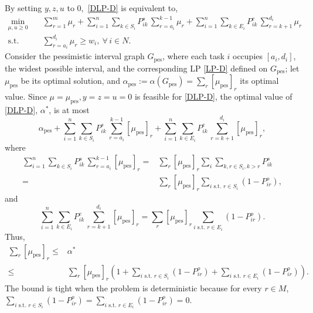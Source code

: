 \documentclass[final,5p,times,twocolumn]{elsarticle}
\DeclareMathOperator{\pes}{pes}
\begin{document}
\noindent
By setting $y,z, u$ to $0$,~\eqref{DLP-D} is equivalent to,
\begin{align*}
\tag{LP-Dpes}
\label{LP-Dpes}
\min_{\mu,u\geq 0}\quad 
& \sum_{r=1}^{m} \mu_r
  + \sum_{i=1}^{n}\sum_{k\in S_i} P^s_{ik}\,\sum_{r=a_i}^{k-1} \mu_r
  + \sum_{i=1}^{n}\sum_{k\in E_i} P^e_{ik}\,\sum_{r=k+1}^{d_i} \mu_r\\
\text{s.t.}\quad 
&\sum_{r=a_i}^{d_i} \mu_r \geq w_i,
~\forall\, i\in N.
\end{align*}
Consider the pessimistic interval graph $G_{\pes}$, where each task $i$ occupies $[a_i,d_i]$, the widest possible interval, and the corresponding LP \eqref{LP-D} defined on $G_{\pes}$; 
let $\mu_{\pes}$ be its optimal solution, and $\alpha_{\pes}:=\alpha(G_{\pes})=\sum_{r}[\mu_{\pes}]_r$ its optimal value.
Since $\mu = \mu_{\pes}, y=z=u=0$ is feasible for \eqref{DLP-D}, the optimal value of \eqref{DLP-D}, $\alpha^*$, is at most \[\alpha_{\pes}+\sum_{i=1}^{n}\sum_{k\in S_i} P^s_{ik}\,\sum_{r=a_i}^{k-1} {[\mu_{\pes}]}_r
  + \sum_{i=1}^{n}\sum_{k\in E_i} P^e_{ik}\,\sum_{r=k+1}^{d_i} {[\mu_{\pes}]}_r,\] where
\begin{align*}
\sum_{i=1}^{n}\sum_{k\in S_i} P^s_{ik}\, \sum_{r=a_i}^{k-1}{[\mu_{\pes}]}_r = & \sum_{r}{[\mu_{\pes}]}_r\sum_{i}\sum_{k,r\in S_i, k>r}P_{ik}^s\\
=&\sum_r {[\mu_{\pes}]}_r \sum_{i\text{ s.t. }r\in S_i} (1-P_{ir}^o),
\end{align*}
and
\[\sum_{i=1}^{n}\sum_{k\in E_i} P^e_{ik}\,\sum_{r=k+1}^{d_i} {[\mu_{\pes}]}_r= \sum_{r}{[\mu_{\pes}]}_r\sum_{i\text{ s.t. }r\in E_i}(1-P_{ir}^o).\]
Thus,
\begin{align*}
\sum_r [\mu_{\pes}]_r\leq & \alpha^*\\
\leq &\sum_r [\mu_{\pes}]_r\left(1+\sum_{i\text{ s.t. }r\in S_i} (1-P_{ir}^o)+\sum_{i\text{ s.t. }r\in E_i} (1-P_{ir}^o)\right).
\end{align*}
The bound is tight when the problem is deterministic because for every $r\in M$, $\sum_{i\text{ s.t. }r\in S_i} (1-P_{ir}^o) = \sum_{i\text{ s.t. }r\in E_i} (1-P_{ir}^o) = 0$.
\end{document}
